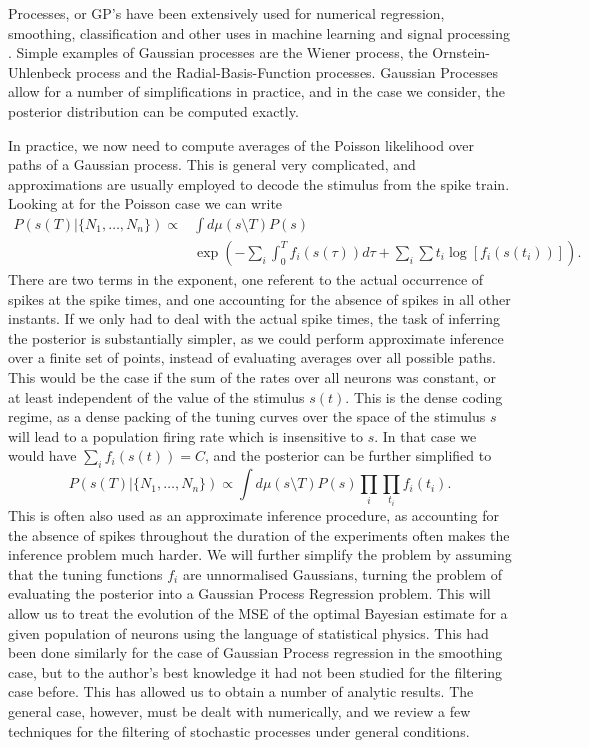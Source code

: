 Processes, or GP's have been extensively used for numerical regression, smoothing, classification and other uses in machine learning and signal 
processing \cite{Rasmussen2005}. Simple examples of Gaussian processes are the Wiener process, the Ornstein-Uhlenbeck process and the Radial-Basis-Function
processes. Gaussian Processes allow for a number of simplifications in practice, and in the case we consider, the posterior distribution can be computed exactly.\par
In practice, we now need to compute averages of the Poisson likelihood over paths of a Gaussian process. This is general very complicated, and approximations are
usually employed to decode the stimulus from the spike train.\cite{Ahmadian2011,Ergun2007} Looking at  for the Poisson case we can write
\begin{align*}
P(s(T)|\{N_1,\ldots,N_n\}) \propto& \int d\mu(s\setminus T) P(s)\\
& \exp\left(-\sum_i \int_0^T f_i(s(\tau)) d\tau + \sum_i \sum{t_i} \log\left[f_i(s(t_i))\right]  \right).
\end{align*}
There are two terms in the exponent, one referent to the actual occurrence of spikes at the spike times, and one accounting for the absence of spikes in all other 
instants. If we only had to deal with the actual spike times, the task of inferring the posterior is substantially simpler, as we could perform approximate inference
over a finite set of points, instead of evaluating averages over all possible paths. This would be the case if the sum of the rates over all neurons was constant, or
at least independent of the value of the stimulus $s(t)$. This is the dense coding regime, as a dense packing of the tuning curves over the space of the stimulus
$s$ will lead to a population firing rate which is insensitive to $s$. In that case we would have $\sum_i f_i(s(t)) = C$, and the posterior can be further simplified to
\[
P(s(T)|\{N_1,\ldots,N_n\}) \propto \int d\mu(s\setminus T) P(s) \prod_i \prod_{t_i} f_i(t_i).
\]
This is often also used as an approximate inference procedure, as accounting for the absence of spikes throughout the duration of the experiments often makes the
inference problem much harder. We will further simplify the problem by assuming that the tuning functions $f_i$ are unnormalised Gaussians, turning the problem of
evaluating the posterior into a Gaussian Process Regression problem. This will allow us to treat the evolution of the MSE of the optimal Bayesian estimate for a
given population of neurons using the language of statistical physics. This had been done similarly for the case of Gaussian Process regression in the smoothing
case,\cite{malzahn2005statistical} but to the author's best knowledge it had not been studied for the filtering case before. This has allowed us to obtain a number of
analytic results. The general case, however, must be dealt with numerically, and we review a few techniques for the filtering of stochastic processes under
general conditions.\par




